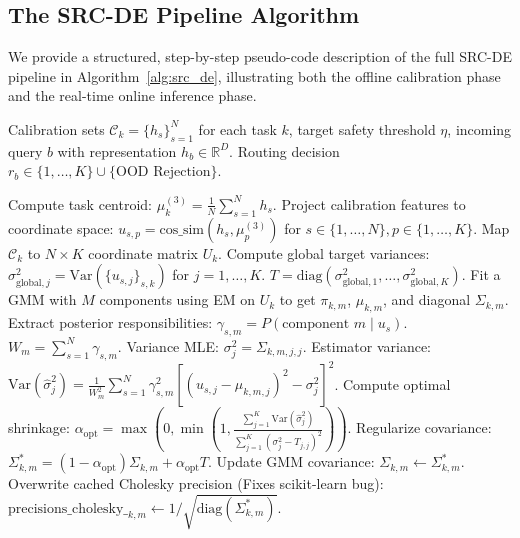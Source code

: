 \subsection{The SRC-DE Pipeline Algorithm}
\label{submission:sec:algorithm}

We provide a structured, step-by-step pseudo-code description of the full SRC-DE pipeline in Algorithm~\ref{alg:src_de}, illustrating both the offline calibration phase and the real-time online inference phase.

\begin{algorithm}[tb]
   \caption{Shrinkage-Regularized Coordinate Density Estimation (SRC-DE)}
   \label{alg:src_de}
\begin{algorithmic}[1]
    Calibration sets $\mathcal{C}_k = \{h_s\}_{s=1}^N$ for each task $k$, target safety threshold $\eta$, incoming query $b$ with representation $h_b \in \mathbb{R}^D$.
    Routing decision $r_b \in \{1, \dots, K\} \cup \{\text{OOD Rejection}\}$.
   
   \STATE {}
       \STATE Compute task centroid: $\mu^{(3)}_k = \frac{1}{N} \sum_{s=1}^N h_s$.
   \ENDFOR
       \STATE Project calibration features to coordinate space:
       \STATE \quad $u_{s, p} = \text{cos\_sim}(h_s, \mu^{(3)}_p)$ for $s \in \{1,\dots,N\}, p \in \{1,\dots,K\}$.
       \STATE Map $\mathcal{C}_k$ to $N \times K$ coordinate matrix $U_k$.
   \ENDFOR
   \STATE Compute global target variances: $\sigma^2_{\text{global}, j} = \text{Var}(\{u_{s, j}\}_{s, k})$ for $j = 1,\dots,K$.
   \STATE $T = \text{diag}(\sigma^2_{\text{global}, 1}, \dots, \sigma^2_{\text{global}, K})$.
       \STATE Fit a GMM with $M$ components using EM on $U_k$ to get $\pi_{k,m}$, $\mu_{k,m}$, and diagonal $\Sigma_{k,m}$.
       \STATE Extract posterior responsibilities: $\gamma_{s, m} = P(\text{component } m \mid u_s)$.
           \STATE $W_m = \sum_{s=1}^N \gamma_{s, m}$.
               \STATE Variance MLE: $\sigma^2_{j} = \Sigma_{k, m, j, j}$.
               \STATE Estimator variance:
               \STATE \quad $\text{Var}(\hat{\sigma}^2_{j}) = \frac{1}{W_m^2} \sum_{s=1}^N \gamma_{s, m}^2 \left[ (u_{s, j} - \mu_{k, m, j})^2 - \sigma^2_{j} \right]^2$.
           \ENDFOR
           \STATE Compute optimal shrinkage:
           \STATE \quad $\alpha_{\text{opt}} = \max\left(0, \min\left(1, \frac{\sum_{j=1}^K \text{Var}(\hat{\sigma}^2_{j})}{\sum_{j=1}^K (\sigma^2_{j} - T_{j,j})^2}\right)\right)$.
           \STATE Regularize covariance: $\Sigma^{*}_{k, m} = (1 - \alpha_{\text{opt}}) \Sigma_{k, m} + \alpha_{\text{opt}} T$.
           \STATE Update GMM covariance: $\Sigma_{k, m} \leftarrow \Sigma^{*}_{k, m}$.
           \STATE Overwrite cached Cholesky precision (Fixes scikit-learn bug):
           \STATE \quad $\text{precisions\_cholesky\_}_{k, m} \leftarrow 1 / \sqrt{\text{diag}(\Sigma^{*}_{k, m})}$.
       \ENDFOR
   \ENDFOR
   

\end{algorithmic}
\end{algorithm}
